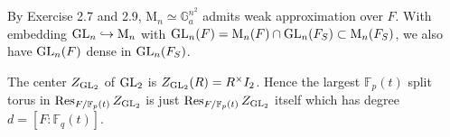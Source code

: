 \begin{problem}
By Exercise 2.7 and 2.9, $\mathrm{M}_{n} \simeq \mathbb{G}_{a}^{n^{2}}$ admits weak approximation over $F$.
With embedding $\operatorname{\mathrm{GL}}_{n} \hookrightarrow \mathrm{M}_{n}$ with $\operatorname{\mathrm{GL}}_{n}(F) = \mathrm{M}_{n}(F) \cap \operatorname{\mathrm{GL}}_{n}(F_S) \subset \mathrm{M}_{n}(F_{S})$,
we also have $\operatorname{\mathrm{GL}}_{n}(F)$ dense in $\operatorname{\mathrm{GL}}_{n}(F_S)$.
\end{problem}


\begin{problem} \notfinish
\end{problem}
\begin{problem} \notfinish
\end{problem}
\begin{problem} \notfinish
\end{problem}
\begin{problem} \notfinish
\end{problem}
\begin{problem} \notfinish
\end{problem}

\begin{problem} \notfinish
The center $Z_{\operatorname{\mathrm{GL}}_2}$ of $\operatorname{\mathrm{GL}}_2$ is $Z_{\operatorname{\mathrm{GL}}_2}(R) = R^{\times}I_2$.
Hence the largest $\mathbb{F}_{p}(t)$ split torus in $\operatorname{\mathrm{Res}}_{F/\mathbb{F}_{p}(t)}Z_{\operatorname{\mathrm{GL}}_2}$
is just $\operatorname{\mathrm{Res}}_{F/\mathbb{F}_{p}(t)}Z_{\operatorname{\mathrm{GL}}_2}$ itself which has degree $d = [F:\mathbb{F}_q(t)]$.
\end{problem}

